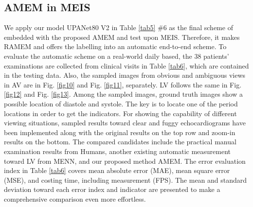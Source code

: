 \documentclass{article}
\begin{document}
\subsection{AMEM in MEIS}
\label{sec5.4}
We apply our model UPANet80 V2 in Table \ref{tab5} \#6 as the final scheme of embedded with the proposed AMEM and test upon MEIS. Therefore, it makes RAMEM and offers the labelling into an automatic end-to-end scheme. To evaluate the automatic scheme on a real-world daily based, the 38 patients’ examinations are collected from clinical visits in Table \ref{tab6}, which are contained in the testing data. Also, the sampled images from obvious and ambiguous views in AV are in Fig. \ref{fig10} and Fig. \ref{fig11}, separately.  LV follows the same in Fig. \ref{fig12} and Fig. \ref{fig13}. Among the sampled images, ground truth images show a possible location of diastole and systole. The key is to locate one of the period locations in order to get the indicators. For showing the capability of different viewing situations, sampled results toward clear and fuggy echocardiograms have been implemented along with the original results on the top row and zoom-in results on the bottom. The compared candidates include the practical manual examination results from Humans, another existing automatic measurement toward LV from MENN, and our proposed method AMEM. The error evaluation index in Table \ref{tab6} covers mean absolute error (MAE), mean square error (MSE), and costing time, including measurement (FPS). The mean and standard deviation toward each error index and indicator are presented to make a comprehensive comparison even more effortless. 
\end{document}
